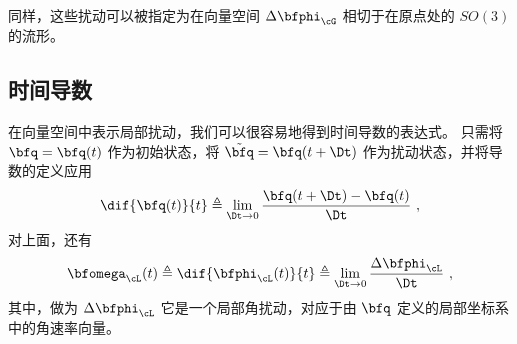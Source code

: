 同样，这些扰动可以被指定为在向量空间 $\Delta\bfphi_\cG$ 相切于在原点处的 $SO(3)$ 的流形。

\subsection{时间导数}

在向量空间中表示局部扰动，我们可以很容易地得到时间导数的表达式。 
只需将 $\bfq=\bfq(t)$ 作为初始状态，将 $\tilde{\bfq}=\bfq(t+\Dt)$ 作为扰动状态，并将导数的定义应用
%
\begin{align}
\dif{\bfq(t)}{t} \triangleq \lim_{\Dt\to0} \frac{\bfq(t+\Dt)-\bfq(t)}{\Dt}~, \label{equ:derivative}
\end{align}%
%
对上面，还有
%
\begin{align}
\bfomega_\cL(t) \triangleq \dif{\bfphi_\cL(t)}{t} \triangleq \lim_{\Dt\to0} \frac{\Delta\bfphi_\cL}{\Dt}~,
\end{align}%
%
其中，做为 $\Delta\bfphi_\cL$ 它是一个局部角扰动，对应于由 $\bfq$ 定义的局部坐标系中的角速率向量。

